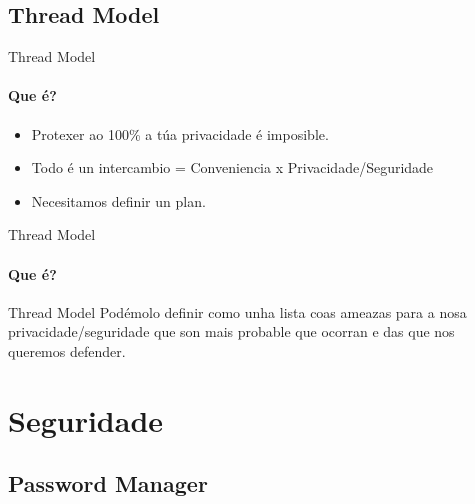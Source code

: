 \documentclass{beamer}
\begin{document}
\subsection{Thread Model}

\begin{frame}{Thread Model}
  \framesubtitle{Que é?}

  \begin{itemize}
    \item Protexer ao 100\% a túa privacidade é imposible. \pause
    \item Todo é un intercambio = Conveniencia x Privacidade/Seguridade \pause
    \item Necesitamos definir un plan.
  \end{itemize}

\end{frame}

\begin{frame}{Thread Model}
  \framesubtitle{Que é?}

  \begin{block}{Thread Model}
    Podémolo definir como unha lista coas ameazas para a nosa privacidade/seguridade que son  mais probable que ocorran
    e das que nos queremos defender.
  \end{block}\pause

\end{frame}

\section{Seguridade}
\subsection{Password Manager}
\end{document}

